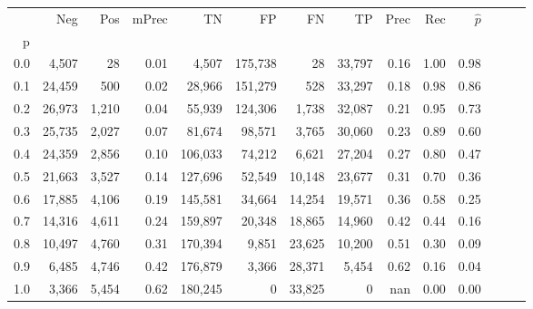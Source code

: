 \begin{tabular}{rrrrrrrrrrrrrr}
\toprule
{} &     Neg &    Pos & mPrec &       TN &       FP &      FN &      TP &  Prec &   Rec & $\hat{p}$ \\
p   &         &        &       &          &          &         &         &       &       &           \\
\midrule
0.0 &   4,507 &     28 &  0.01 &    4,507 &  175,738 &      28 &  33,797 &  0.16 &  1.00 &      0.98 \\
0.1 &  24,459 &    500 &  0.02 &   28,966 &  151,279 &     528 &  33,297 &  0.18 &  0.98 &      0.86 \\
0.2 &  26,973 &  1,210 &  0.04 &   55,939 &  124,306 &   1,738 &  32,087 &  0.21 &  0.95 &      0.73 \\
0.3 &  25,735 &  2,027 &  0.07 &   81,674 &   98,571 &   3,765 &  30,060 &  0.23 &  0.89 &      0.60 \\
0.4 &  24,359 &  2,856 &  0.10 &  106,033 &   74,212 &   6,621 &  27,204 &  0.27 &  0.80 &      0.47 \\
0.5 &  21,663 &  3,527 &  0.14 &  127,696 &   52,549 &  10,148 &  23,677 &  0.31 &  0.70 &      0.36 \\
0.6 &  17,885 &  4,106 &  0.19 &  145,581 &   34,664 &  14,254 &  19,571 &  0.36 &  0.58 &      0.25 \\
0.7 &  14,316 &  4,611 &  0.24 &  159,897 &   20,348 &  18,865 &  14,960 &  0.42 &  0.44 &      0.16 \\
0.8 &  10,497 &  4,760 &  0.31 &  170,394 &    9,851 &  23,625 &  10,200 &  0.51 &  0.30 &      0.09 \\
0.9 &   6,485 &  4,746 &  0.42 &  176,879 &    3,366 &  28,371 &   5,454 &  0.62 &  0.16 &      0.04 \\
1.0 &   3,366 &  5,454 &  0.62 &  180,245 &        0 &  33,825 &       0 &   nan &  0.00 &      0.00 \\
\bottomrule
\end{tabular}
